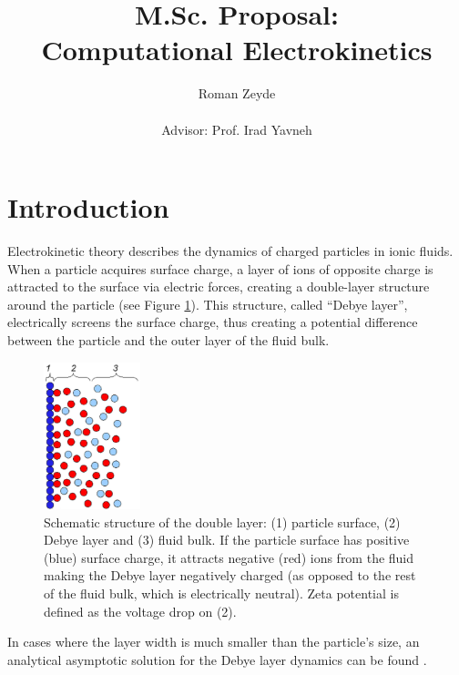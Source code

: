 \documentclass[12pt]{article}
\title{M.Sc. Proposal: \\ \bigskip
Computational Electrokinetics}
\author{Roman Zeyde \\ \\  {\small Advisor: Prof. Irad Yavneh} }
\begin{document}
\maketitle
\section{Introduction}
Electrokinetic theory describes the dynamics of charged particles
in ionic fluids. When a particle acquires surface charge, a layer
of ions of opposite charge is attracted to the surface via
electric forces, creating a double-layer structure around the
particle (see Figure \ref{fig:EDL}). This structure, called
``Debye layer'', electrically screens the surface charge, thus
creating a potential difference between the particle and the outer
layer of the fluid bulk.
\begin{figure}[htbp]
\begin{framed}
    \begin{center}
        \includegraphics[width=0.25\textwidth]
            {ElectricDoubleLayer.eps}
        \caption{Schematic structure of the double layer:
        (1) particle surface, (2) Debye layer and (3) fluid bulk.
        If the particle surface has positive (blue) surface charge,
        it attracts negative (red) ions from the fluid making the
        Debye layer negatively charged (as opposed to the rest of
        the fluid bulk, which is electrically neutral).
        Zeta potential is defined as the voltage drop on (2).}
        \label{fig:EDL}
    \end{center}
\end{framed}
\end{figure}
In cases where the layer width is much smaller than the particle's
size, an analytical asymptotic solution for the Debye layer
dynamics can be found \cite{yariv2010asymptotic}.
\end{document}

